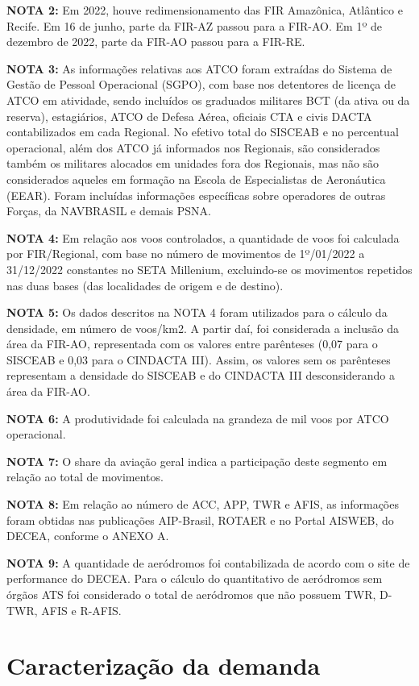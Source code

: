 \documentclass[
]{book}
\begin{document}
\textbf{NOTA 2:} Em 2022, houve redimensionamento das FIR Amazônica, Atlântico e Recife. Em 16 de junho, parte da FIR-AZ passou para a FIR-AO. Em 1º de dezembro de 2022, parte da FIR-AO passou para a FIR-RE.

\textbf{NOTA 3:} As informações relativas aos ATCO foram extraídas do Sistema de Gestão de Pessoal Operacional (SGPO), com base nos detentores de licença de ATCO em atividade, sendo incluídos os graduados militares BCT (da ativa ou da reserva), estagiários, ATCO de Defesa Aérea, oficiais CTA e civis DACTA contabilizados em cada Regional. No efetivo total do SISCEAB e no percentual operacional, além dos ATCO já informados nos Regionais, são considerados também os militares alocados em unidades fora dos Regionais, mas não são considerados aqueles em formação na Escola de Especialistas de Aeronáutica (EEAR). Foram incluídas informações específicas sobre operadores de outras Forças, da NAVBRASIL e demais PSNA.

\textbf{NOTA 4:} Em relação aos voos controlados, a quantidade de voos foi calculada por FIR/Regional, com base no número de movimentos de 1º/01/2022 a 31/12/2022 constantes no SETA Millenium, excluindo-se os movimentos repetidos nas duas bases (das localidades de origem e de destino).

\textbf{NOTA 5:} Os dados descritos na NOTA 4 foram utilizados para o cálculo da densidade, em número de voos/km2. A partir daí, foi considerada a inclusão da área da FIR-AO, representada com os valores entre parênteses (0,07 para o SISCEAB e 0,03 para o CINDACTA III). Assim, os valores sem os parênteses representam a densidade do SISCEAB e do CINDACTA III desconsiderando a área da FIR-AO.

\textbf{NOTA 6:} A produtividade foi calculada na grandeza de mil voos por ATCO operacional.

\textbf{NOTA 7:} O share da aviação geral indica a participação deste segmento em relação ao total de movimentos.

\textbf{NOTA 8:} Em relação ao número de ACC, APP, TWR e AFIS, as informações foram obtidas nas publicações AIP-Brasil, ROTAER e no Portal AISWEB, do DECEA, conforme o ANEXO A.

\textbf{NOTA 9:} A quantidade de aeródromos foi contabilizada de acordo com o site de performance do DECEA. Para o cálculo do quantitativo de aeródromos sem órgãos ATS foi considerado o total de aeródromos que não possuem TWR, D-TWR, AFIS e R-AFIS.

\hypertarget{caracterizauxe7uxe3o-da-demanda}{%
\section{Caracterização da demanda}\label{caracterizauxe7uxe3o-da-demanda}}
\end{document}
